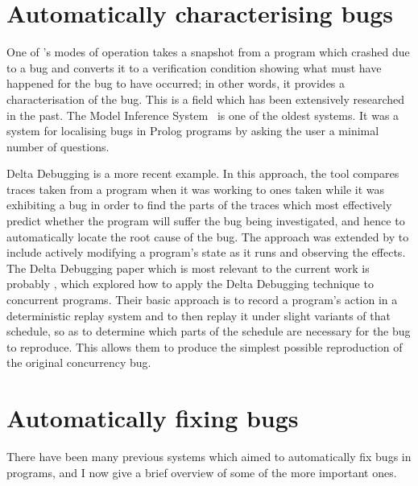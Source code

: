 

\section{Automatically characterising bugs}

One of {\implementation}'s modes of operation takes a snapshot from a
program which crashed due to a bug and converts it to a verification
condition showing what must have happened for the bug to have
occurred; in other words, it provides a characterisation of the bug.
This is a field which has been extensively researched in the past.
The Model Inference System~\cite{Shapiro1982} is one of the oldest
systems.  It was a system for localising bugs in Prolog programs by
asking the user a minimal number of questions.

Delta Debugging\cite{Cleve2005} is a more recent example.  In this
approach, the tool compares traces taken from a program when it was
working to ones taken while it was exhibiting a bug in order to find
the parts of the traces which most effectively predict whether the
program will suffer the bug being investigated, and hence to
automatically locate the root cause of the bug.  The approach was
extended by \cite{Jeffrey2009} to include actively
modifying a program's state as it runs and observing the effects.  The
Delta Debugging paper which is most relevant to the current work is
probably \cite{Choi2002}, which explored how to apply the Delta
Debugging technique to concurrent programs.  Their basic approach is
to record a program's action in a deterministic replay system and to
then replay it under slight variants of that schedule, so as to
determine which parts of the schedule are necessary for the bug to
reproduce.  This allows them to produce the simplest possible
reproduction of the original concurrency bug.  

\section{Automatically fixing bugs}


There have been many previous systems which aimed to automatically fix
bugs in programs, and I now give a brief overview of some of the more
important ones.

